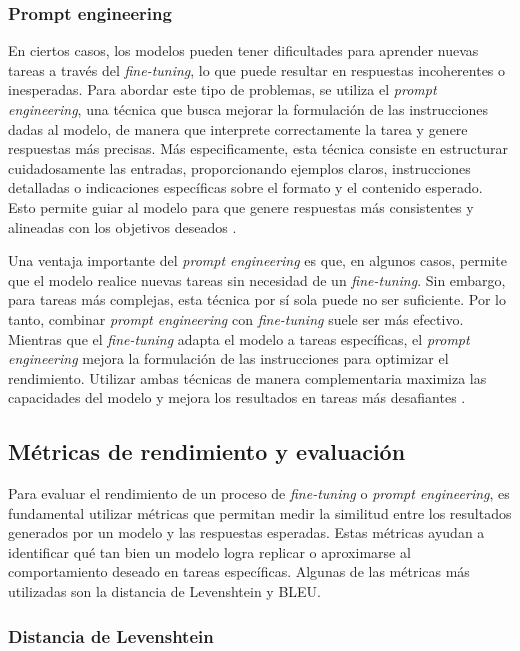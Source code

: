 \subsubsection{Prompt engineering}

En ciertos casos, los modelos pueden tener dificultades para aprender nuevas tareas a través del \textit{fine-tuning}, lo que puede resultar en respuestas incoherentes o inesperadas. Para abordar este tipo de problemas, se utiliza el \textit{prompt engineering}, una técnica que busca mejorar la formulación de las instrucciones dadas al modelo, de manera que interprete correctamente la tarea y genere respuestas más precisas. Más especificamente, esta técnica consiste en estructurar cuidadosamente las entradas, proporcionando ejemplos claros, instrucciones detalladas o indicaciones específicas sobre el formato y el contenido esperado. Esto permite guiar al modelo para que genere respuestas más consistentes y alineadas con los objetivos deseados \cite{thirtyfive}.

Una ventaja importante del \textit{prompt engineering} es que, en algunos casos, permite que el modelo realice nuevas tareas sin necesidad de un \textit{fine-tuning}. Sin embargo, para tareas más complejas, esta técnica por sí sola puede no ser suficiente. Por lo tanto, combinar \textit{prompt engineering} con \textit{fine-tuning} suele ser más efectivo. Mientras que el \textit{fine-tuning} adapta el modelo a tareas específicas, el \textit{prompt engineering} mejora la formulación de las instrucciones para optimizar el rendimiento. Utilizar ambas técnicas de manera complementaria maximiza las capacidades del modelo y mejora los resultados en tareas más desafiantes \cite{thirtyfive}.



\subsection{Métricas de rendimiento y evaluación}  

Para evaluar el rendimiento de un proceso de \textit{fine-tuning} o \textit{prompt engineering}, es fundamental utilizar métricas que permitan medir la similitud entre los resultados generados por un modelo y las respuestas esperadas. Estas métricas ayudan a identificar qué tan bien un modelo logra replicar o aproximarse al comportamiento deseado en tareas específicas. Algunas de las métricas más utilizadas son la distancia de Levenshtein y BLEU.

\subsubsection{Distancia de Levenshtein}

